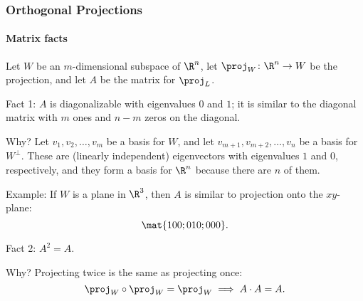 \begin{frame}
\frametitle{Orthogonal Projections}
\framesubtitle{Matrix facts}

Let $W$ be an $m$-dimensional subspace of $\R^n$, let $\proj_W\colon\R^n\to W$
be the projection, and let $A$ be the matrix for $\proj_L$.

\pause\medskip
\alert{Fact 1:} $A$ is diagonalizable with eigenvalues $0$ and $1$; it is
similar to the diagonal matrix with $m$ ones and $n-m$ zeros on the diagonal.

\medskip
\begin{webonly}
  \alert{Why?} Let $v_1,v_2,\ldots,v_m$ be a basis for $W$, and let
  $v_{m+1},v_{m+2},\ldots,v_n$ be a basis for $W^\perp$.  These are (linearly
  independent) eigenvectors with eigenvalues $1$ and $0$, respectively, and they
  form a basis for $\R^n$ because there are $n$ of them.

  \medskip
  \alert{Example:} If $W$ is a plane in $\R^3$, then $A$ is similar
  to projection onto the $xy$-plane:
  \[ \mat{1 0 0; 0 1 0; 0 0 0}. \]
\end{webonly}

\pause\medskip
\alert{Fact 2:} $A^2 = A$.

\medskip
\begin{webonly}
  \alert{Why?} Projecting twice is the same as projecting once:
  \[ \proj_W\circ\proj_W = \proj_W \implies A\cdot A = A. \]
\end{webonly}

\end{frame}




